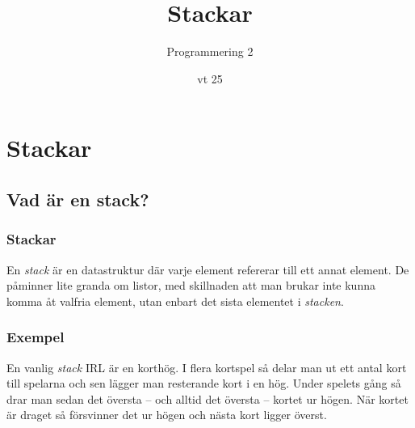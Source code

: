 \documentclass[aspectratio=169]{beamer}
\begin{document}

\newcommand{\fortt}{\texttt{for}}
\newcommand{\whilett}{\texttt{while}}
\newcommand{\iftt}{\texttt{if}}


\title{Stackar}
\date{vt 25}
\author{Programmering 2}

\maketitle

\tableofcontents

\section{Stackar}

\subsection{Vad är en stack?}

\begin{frame}
	\frametitle{Stackar}
	
	En \textit{stack} är en datastruktur där varje element refererar till ett annat element. De påminner lite granda om listor, med skillnaden att man brukar inte kunna komma åt valfria element, utan enbart det sista elementet i \textit{stacken}.
	
\end{frame}

\begin{frame}
	\frametitle{Exempel}
	
	En vanlig \textit{stack} IRL är en korthög. I flera kortspel så delar man ut ett antal kort till spelarna och sen lägger man resterande kort i en hög. Under spelets gång så drar man sedan det översta -- och alltid det översta -- kortet ur högen. När kortet är draget så försvinner det ur högen och nästa kort ligger överst.
	
\end{frame}
\end{document}
